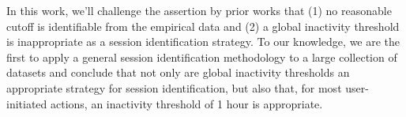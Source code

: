 In this work, we'll challenge the assertion by prior works that (1) no reasonable cutoff is identifiable from the empirical data and (2) a global inactivity threshold is inappropriate as a session identification strategy.  To our knowledge, we are the first to apply a general session identification methodology to a large collection of datasets and conclude that not only are global inactivity thresholds an appropriate strategy for session identification, but also that, for most user-initiated actions, an inactivity threshold of 1 hour is appropriate.
